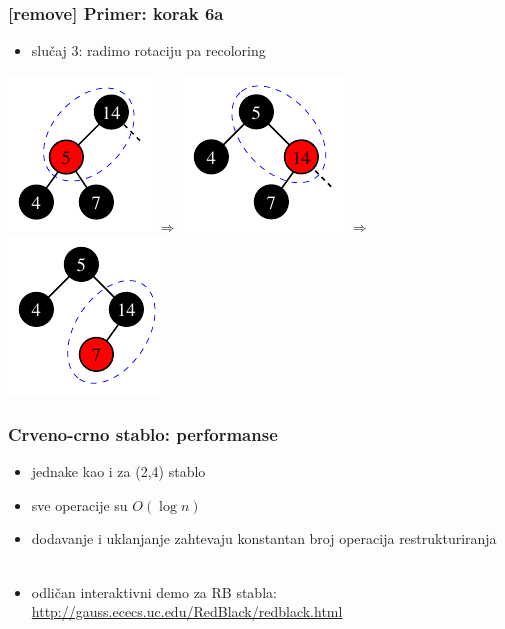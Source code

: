 \documentclass[compress,aspectratio=169]{beamer}
\begin{document}
\begin{frame}[fragile]
  \frametitle{[remove] Primer: korak 6a}
  \begin{itemize}
    \item slučaj 3: radimo rotaciju pa recoloring
  \end{itemize}
  \begin{center}
    \includegraphics[scale=0.8]{asp-11-del-09.pdf} $\Rightarrow$
    \includegraphics[scale=0.8]{asp-11-del-10.pdf} $\Rightarrow$
    \includegraphics[scale=0.8]{asp-11-del-11.pdf}
  \end{center}
\end{frame}

\begin{frame}[fragile]
  \frametitle{Crveno-crno stablo: performanse}
  \begin{itemize}
    \item jednake kao i za (2,4) stablo
    \item sve operacije su $O(\log n)$ 
    \item dodavanje i uklanjanje zahtevaju konstantan broj operacija restrukturiranja \\ \ \\
    \item odličan interaktivni demo za RB stabla: \\
    \url{http://gauss.ececs.uc.edu/RedBlack/redblack.html}
  \end{itemize}
\end{frame}
\end{document}

